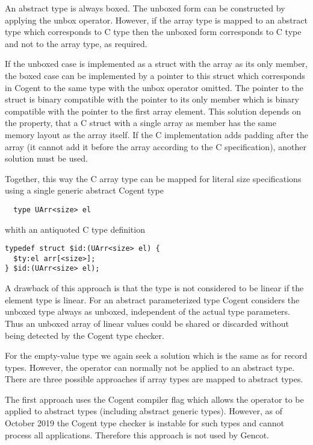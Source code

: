 An abstract type is always boxed. The unboxed form can be constructed by applying the unbox operator. However, if
the array type is mapped to an abstract type which corresponds to C type  then the unboxed form
corresponds to C type  and not to the array type, as required.

If the unboxed case is implemented as a struct with the array as its only member, the
boxed case can be implemented by a pointer to this struct which corresponds in Cogent to the same type
with the unbox operator omitted. The pointer to the struct is binary compatible with the pointer to its
only member which is binary compatible with the pointer to the first array element. 
This solution depends on the property, that a C struct with a single array as member has the same memory
layout as the array itself. If the C implementation adds padding after the array (it
cannot add it before the array according to the C specification), another solution must be used.

Together, this way the C array type can be mapped for literal size specifications using a single generic abstract Cogent type
\begin{verbatim}
  type UArr<size> el
\end{verbatim}
whith an antiquoted C type definition 
\begin{verbatim}
typedef struct $id:(UArr<size> el) {
  $ty:el arr[<size>];
} $id:(UArr<size> el);
\end{verbatim}

A drawback of this approach is that the type  is not considered to be linear if the element 
type  is linear. For an abstract parameterized type Cogent considers the unboxed type always as unboxed,
independent of the actual type parameters. Thus an unboxed array of linear values could be shared or discarded 
without being detected by the Cogent type checker.

For the empty-value type we again seek a solution which is the same as for record types. However, the 
 operator can normally not be applied to an abstract type. There are three possible approaches if
array types are mapped to abstract types.

The first approach uses the Cogent compiler flag  which allows the  operator to
be applied to abstract types (including abstract generic types). However, as of October 2019 the Cogent type checker 
is instable for such types and cannot process all applications. Therefore this approach is not used by Gencot.

